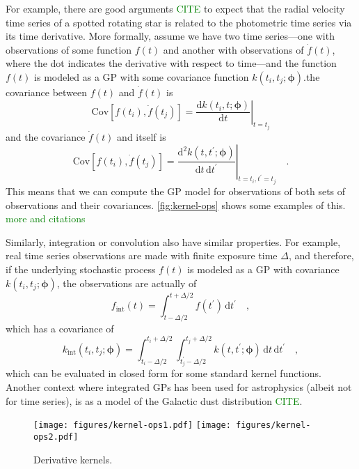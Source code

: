 \documentclass[letterpaper]{ar-1col}
\newcommand{\dan}[1]{\textcolor{green}{#1}}
\newcommand{\hyperparams}{\ensuremath{\boldsymbol{\phi}}}
\begin{document}
For example, there are good arguments \dan{CITE} to expect that the radial velocity time series of a spotted rotating star is related to the photometric time series via its time derivative.
More formally, assume we have two time series---one with observations of some function $f(t)$ and another with observations of $\dot{f}(t)$, where the dot indicates the derivative with respect to time---and the function $f(t)$ is modeled as a GP with some covariance function $k(t_i,t_j;\hyperparams)$.the covariance between $f(t)$ and $\dot{f}(t)$ is
\begin{equation}
  \mathrm{Cov}\left[f(t_i),\dot{f}(t_j)\right] = \left.\frac{\mathrm{d}k(t_i,t;\hyperparams)}{\mathrm{d}t}\right|_{t=t_j}
\end{equation}
and the covariance $\dot{f}(t)$ and itself is
\begin{equation}
  \mathrm{Cov}\left[f(t_i),\dot{f}(t_j)\right] = \left.\frac{\mathrm{d}^2k(t,t^\prime;\hyperparams)}{\mathrm{d}t\,\mathrm{d}t^\prime}\right|_{t=t_i,t^\prime=t_j} \quad.
\end{equation}
This means that we can compute the GP model for observations of both sets of observations and their covariances.
\autoref{fig:kernel-ops} shows some examples of this. \dan{more and citations}

Similarly, integration or convolution also have similar properties.
For example, real time series observations are made with finite exposure time $\Delta$, and therefore, if the underlying stochastic process $f(t)$ is modeled as a GP with covariance $k(t_i,t_j;\hyperparams)$, the observations are actually of
\begin{equation}
  f_\mathrm{int}(t) = \int_{t-\Delta/2}^{t+\Delta/2} f(t^\prime)\,\mathrm{d}t^\prime \quad,
\end{equation}
which has a covariance of
\begin{equation}
  k_\mathrm{int}(t_i,t_j;\hyperparams) = \int_{t_i-\Delta/2}^{t_i+\Delta/2}\int_{t_j^\prime-\Delta/2}^{t_j+\Delta/2} k(t,t^\prime;\hyperparams)\,\mathrm{d}t\,\mathrm{d}t^\prime \quad,
\end{equation}
which can be evaluated in closed form for some standard kernel functions.
Another context where integrated GPs has been used for astrophysics (albeit not for time series), is as a model of the Galactic dust distribution \dan{CITE}.

\begin{figure}[ht]
  \centering
  \texttt{[image: figures/kernel-ops1.pdf]}
  \texttt{[image: figures/kernel-ops2.pdf]}
  \caption{Derivative kernels.}
  \label{fig:kernel-ops}
\end{figure}
\end{document}
